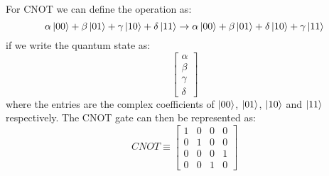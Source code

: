 \documentclass[reqno]{amsart}
\numberwithin{equation}{section}
\numberwithin{figure}{section}
\begin{document}
\begin{justify}
For CNOT we can define the operation as:
    \begin{equation}
        \alpha\ket{00} + \beta\ket{01} + \gamma\ket{10} + \delta\ket{11} \rightarrow \alpha\ket{00} + \beta\ket{01} + \delta\ket{10} + \gamma\ket{11}
    \end{equation}
if we write the quantum state as:
    \begin{equation}
        \begin{bmatrix}
            \alpha \\
            \beta \\
            \gamma \\
            \delta
        \end{bmatrix}
        \label{eq:2qubitmatrix}
    \end{equation}
where the entries are the complex coefficients of $\ket{00}$, $\ket{01}$, $\ket{10}$ and $\ket{11}$ respectively. The CNOT gate can then be represented as:
    \begin{equation}
        CNOT \equiv \begin{bmatrix}
                    1 & 0 & 0 & 0 \\
                    0 & 1 & 0 & 0 \\
                    0 & 0 & 0 & 1 \\
                    0 & 0 & 1 & 0
                \end{bmatrix}
    \end{equation}


\end{justify}
\end{document}
